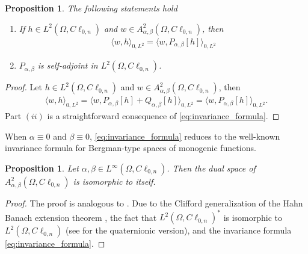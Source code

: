 \documentclass[12pt]{article}
\newcommand{\comment}[1]{\marginpar{\hfuzz=5ex
\scriptsize$\stackrel{?}{\longleftarrow}$\\\hspace*{-3ex}
{\fbox{\parbox{20ex}{\hfuzz=15ex \raggedright\sf#1 }}} }}
\newtheorem{proposition}[theorem]{Proposition}
\begin{document}
\begin{proposition}\label{prop:invariance} The following statements hold
\begin{enumerate}
\item[(i)] If $h\in L^2(\Omega,C\ell_{0,n})$ and $w\in A_{\alpha,\beta}^2(\Omega,C\ell_{0,n})$, then 
\begin{align}\label{eq:invariance_formula}
\langle w,h\rangle_{0,L^2}=\langle w, P_{\alpha,\beta}[h]\rangle_{0,L^2}
\end{align}
\item [(ii)] $P_{\alpha,\beta}$ is self-adjoint in $L^2(\Omega,C\ell_{0,n})$.
\end{enumerate}
\end{proposition}
\begin{proof}
Let $h\in L^2(\Omega,C\ell_{0,n})$ and $w\in A_{\alpha,\beta}^2(\Omega,C\ell_{0,n})$, then
\begin{align*}
   \langle w,h\rangle_{0,L^2}=\langle w, P_{\alpha,\beta}[h]+Q_{\alpha,\beta}[h]\rangle_{0,L^2}=\langle w, P_{\alpha,\beta}[h]\rangle_{0,L^2}.
\end{align*}
Part $(ii)$ is a straightforward consequence of \eqref{eq:invariance_formula}.
\end{proof}
When $\alpha\equiv 0$ and $\beta\equiv 0$, \eqref{eq:invariance_formula} reduces to the well-known invariance formula for Bergman-type spaces of monogenic functions.
\begin{proposition}\label{prop:dual-space}
Let $\alpha, \beta \in L^{\infty}(\Omega,C\ell_{0,n})$. Then the dual space of $A_{\alpha,\beta}^2(\Omega,C\ell_{0,n})$ is isomorphic to itself.
\end{proposition}
\begin{proof}
The proof is analogous to \cite[Prop.\ 3.8]{DelLeb2020}. Due to the Clifford generalization of the Hahn Banach extension theorem \cite{BDS1982}, the fact that $L^2(\Omega, C\ell_{0,n})^*$ is isomorphic to $L^2(\Omega, C\ell_{0,n})$ (see \cite[Th.\ 10.1, 10.3]{GuHaSpr2008} for the quaternionic version), and the invariance formula \eqref{eq:invariance_formula}.
\end{proof}
\end{document}
